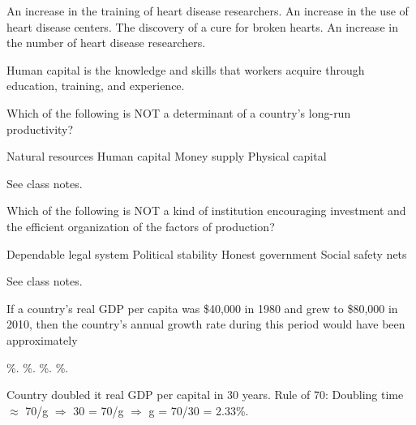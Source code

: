 \documentclass[addpoints,11pt]{exam}
\theoremstyle{definition}
\begin{document}
\begin{questions}
			\begin{choices}
				\CorrectChoice An increase in the training of heart disease researchers.
				\choice An increase in the use of heart disease centers.
				\choice The discovery of a cure for broken hearts.
				\choice An increase in the number of heart disease researchers.
			\end{choices}
			
			\begin{solution}
				Human capital is the knowledge and skills that workers acquire through education, training, and experience.
			\end{solution}
			
		\question Which of the following is NOT a determinant of a country's long-run productivity?
		
		\begin{choices}
			\choice Natural resources
			\choice Human capital
			\CorrectChoice Money supply
			\choice Physical capital
		\end{choices}
		
		\begin{solution}
			See class notes.
		\end{solution}
			
			
			\question Which of the following is NOT a kind of institution encouraging investment and the efficient organization of the factors of production?
			
			\begin{choices}
				\choice Dependable legal system
				\choice Political stability
				\choice Honest government
				\CorrectChoice Social safety nets
			\end{choices}
			
			\begin{solution}
				See class notes.
			\end{solution}
			
			\question If a country's real GDP per capita was \$40,000 in 1980 and grew to \$80,000 in 2010, then the country's annual growth rate during this period would have been approximately 
			
			\begin{choices}
				\CorrectChoice 2.3\%.
				\choice 50\%.
				\choice 3\%.
				\choice 100\%.
			\end{choices}
			
			\begin{solution}
				Country doubled it real GDP per capital in 30 years. Rule of 70: Doubling time $\approx$ 70/g $\Rightarrow$ 30 = 70/g $\Rightarrow$ g = 70/30 = 2.33\%.
			\end{solution}
			

\end{questions}
\end{document}
